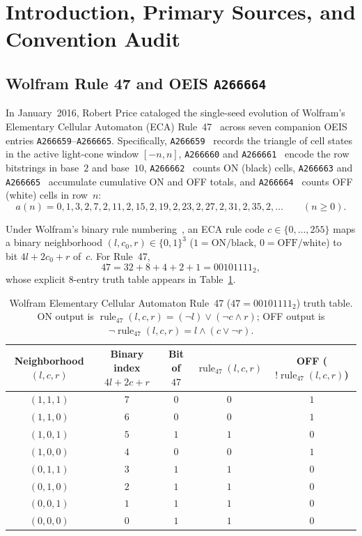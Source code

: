 \documentclass[11pt]{article}
\theoremstyle{definition}
\newcommand{\seq}[1]{\texttt{#1}}
\newcommand{\ruleFS}{\operatorname{rule}_{47}}
\begin{document}
\section{Introduction, Primary Sources, and Convention Audit}

\subsection{Wolfram Rule 47 and OEIS \texorpdfstring{\seq{A266664}}{A266664}}

In January~2016, Robert Price cataloged the single-seed evolution of Wolfram's Elementary Cellular Automaton (ECA) Rule~47~\cite{wolfram2002,mathworldECA} across seven companion OEIS entries \seq{A266659}--\seq{A266665}. Specifically, \seq{A266659}~\cite{oeis266659} records the triangle of cell states in the active light-cone window $[-n, n]$, \seq{A266660} and \seq{A266661}~\cite{oeis266660,oeis266661} encode the row bitstrings in base~$2$ and base~$10$, \seq{A266662}~\cite{oeis266662} counts ON (black) cells, \seq{A266663} and \seq{A266665}~\cite{oeis266663,oeis266665} accumulate cumulative ON and OFF totals, and \seq{A266664}~\cite{oeis266664} counts OFF (white) cells in row~$n$:
\[
a(n) = 0, 1, 3, 2, 7, 2, 11, 2, 15, 2, 19, 2, 23, 2, 27, 2, 31, 2, 35, 2, \dots \qquad (n \ge 0).
\]

Under Wolfram's binary rule numbering~\cite{wolfram2002}, an ECA rule code $c \in \{0, \dots, 255\}$ maps a binary neighborhood $(l, c_0, r) \in \{0, 1\}^3$ ($1 = \text{ON/black}$, $0 = \text{OFF/white}$) to bit $4l + 2c_0 + r$ of~$c$. For Rule~47,
\[
47 = 32 + 8 + 4 + 2 + 1 = 00101111_2,
\]
whose explicit $8$-entry truth table appears in Table~\ref{tab:rule47-tt}.

\begin{table}[ht]
\centering
\caption{Wolfram Elementary Cellular Automaton Rule~47 ($47 = 00101111_2$) truth table. ON output is $\ruleFS(l, c, r) = (\neg l) \lor (\neg c \land r)$; OFF output is $\neg\ruleFS(l, c, r) = l \land (c \lor \neg r)$.}
\label{tab:rule47-tt}
\smallskip
{\small
\begin{tabular}{@{}c c c c c@{}}
\toprule
Neighborhood $(l, c, r)$ & Binary index $4l + 2c + r$ & Bit of $47$ & $\ruleFS(l, c, r)$ & OFF ($!\ruleFS(l, c, r)$) \\
\midrule
$(1, 1, 1)$ & $7$ & $0$ & $0$ & $1$ \\
$(1, 1, 0)$ & $6$ & $0$ & $0$ & $1$ \\
$(1, 0, 1)$ & $5$ & $1$ & $1$ & $0$ \\
$(1, 0, 0)$ & $4$ & $0$ & $0$ & $1$ \\
$(0, 1, 1)$ & $3$ & $1$ & $1$ & $0$ \\
$(0, 1, 0)$ & $2$ & $1$ & $1$ & $0$ \\
$(0, 0, 1)$ & $1$ & $1$ & $1$ & $0$ \\
$(0, 0, 0)$ & $0$ & $1$ & $1$ & $0$ \\
\bottomrule
\end{tabular}
}
\end{table}
\end{document}
